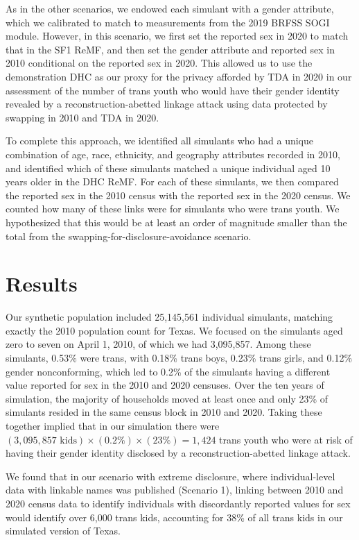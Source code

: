 \documentclass{jpc} %
\theoremstyle{plain}\newtheorem{satz}[thm]{Satz} %
\begin{document}
As in the other scenarios, we endowed each simulant with a gender attribute, which we calibrated to match to measurements from the 2019 BRFSS SOGI module. However, in this scenario, we first set the reported sex in 2020 to match that in the SF1 ReMF, and then set the gender attribute and reported sex in 2010 conditional on the reported sex in 2020.  This allowed us to use the demonstration DHC as our proxy for the privacy afforded by TDA in 2020 in our assessment of the number of trans youth who would have their gender identity revealed by a reconstruction-abetted linkage attack using data protected by swapping in 2010 and TDA in 2020.

To complete this approach, we identified all simulants who had a unique combination of age, race, ethnicity, and geography attributes recorded in 2010, and identified which of these simulants matched a unique individual aged 10 years older in the DHC ReMF.  For each of these simulants, we then compared the reported sex in the 2010 census with the reported sex in the 2020 census. We counted how many of these links were for simulants who were trans youth.  We hypothesized that this would be at least an order of magnitude smaller than the total from the swapping-for-disclosure-avoidance scenario.

\section*{Results}

Our synthetic population included 25,145,561 individual simulants, matching exactly the 2010 population count for Texas.  We focused on the simulants aged zero to seven on April 1, 2010, of which we had 3,095,857.
Among these simulants, 0.53\% were trans, with 0.18\% trans boys, 0.23\% trans girls, and 0.12\% gender nonconforming, which led to 0.2\% of the simulants having a different value reported for sex in the 2010 and 2020 censuses.
Over the ten years of simulation, the majority of households moved at least once and only 23\% of simulants resided in the same census block in 2010 and 2020.
Taking these together implied that in our simulation there were $(3,095,857 \text{ kids}) \times (0.2\%) \times (23\%) = 1,424$ trans youth who were at risk of having their gender identity disclosed by a reconstruction-abetted linkage attack.

We found that in our scenario with extreme disclosure, where individual-level data with linkable names was published (Scenario 1), linking between 2010 and 2020 census data to identify individuals with discordantly reported values for sex would identify over 6,000 trans kids, accounting for 38\% of all trans kids in our simulated version of Texas.
\end{document}
